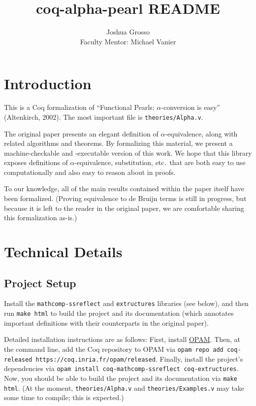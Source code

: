 \documentclass{article}
\title{coq-alpha-pearl README}
\author{Joshua Grosso \\ Faculty Mentor: Michael Vanier}
\begin{document}
\maketitle

\section{Introduction}

This is a Coq formalization of ``Functional Pearls: $\alpha$-conversion is easy'' (Altenkirch,
2002). The most important file is \verb|theories/Alpha.v|.

The original paper presents an elegant definition of $\alpha$-equivalence, along with related
algorithms and theorems. By formalizing this material, we present a machine-checkable and
-executable version of this work. We hope that this library exposes definitions of
$\alpha$-equivalence, substitution, etc.\ that are both easy to use computationally and also easy to
reason about in proofs.

To our knowledge, all of the main results contained within the paper itself have been formalized.
(Proving equivalence to de Bruijn terms is still in progress, but because it is left to the reader
in the original paper, we are comfortable sharing this formalization as-is.)

\section{Technical Details}

\subsection{Project Setup}

Install the \verb|mathcomp-ssreflect| and \verb|extructures| libraries (see below), and then run
\verb|make html| to build the project and its documentation (which annotates important definitions
with their counterparts in the original paper).

Detailed installation instructions are as follows: First, install
\href{https://opam.ocaml.org/doc/Install.html}{OPAM}. Then, at the command line, add the Coq
repository to OPAM via \verb|opam repo add coq-released https://coq.inria.fr/opam/released|.
Finally, install the project's dependencies via
\verb|opam install coq-mathcomp-ssreflect coq-extructures|. Now, you should be able to build the
project and its documentation via \verb|make html|. (At the moment, \verb|theories/Alpha.v| and
\verb|theories/Examples.v| may take some time to compile; this is expected.)
\end{document}
